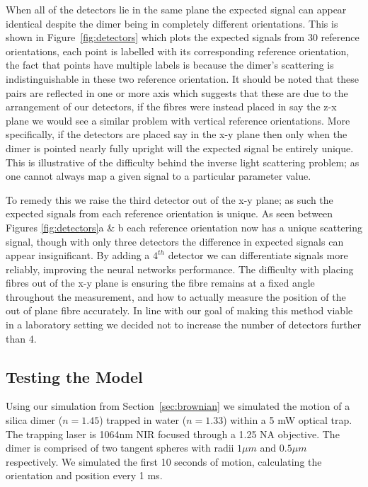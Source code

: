 \documentclass[preprint,  3p]{elsarticle}
\begin{document}
 When all of the detectors lie in the same plane the expected signal can appear identical despite the dimer being in completely different orientations. This is shown in Figure~\ref{fig:detectors} which plots the expected signals from 30 reference orientations, each point is labelled with its corresponding reference orientation, the fact that points have multiple labels is because the dimer's scattering is indistinguishable in these two reference orientation. It should be noted that these pairs are reflected in one or more axis which suggests that these are due to the arrangement of our detectors, if the fibres were instead placed in say the z-x plane we would see a similar problem with vertical reference orientations. More specifically, if the detectors are placed say in the x-y plane then only when the dimer is pointed nearly fully upright will the expected signal be entirely unique. This is illustrative of the difficulty behind the inverse light scattering problem; as one cannot always map a given signal to a particular parameter value.

To remedy this we raise the third detector out of the x-y plane; as such the expected signals from each reference orientation is unique. As seen between Figures \ref{fig:detectors}a \& b each reference orientation now has a unique scattering signal, though with only three detectors the difference in expected signals can appear insignificant. By adding a $4^{th}$ detector we can differentiate signals more reliably, improving the neural networks performance. The difficulty with placing fibres out of the x-y plane is ensuring the fibre remains at a fixed angle throughout the measurement, and how to actually measure the position of the out of plane fibre accurately. In line with our goal of making this method viable in a laboratory setting we decided not to increase the number of detectors further than 4. 

\subsection{Testing the Model}
\label{sec:test}
Using our simulation from Section~\ref{sec:brownian} we simulated the motion of a silica dimer ($n = 1.45$) trapped in water ($n = 1.33$) within a 5 mW optical trap. The trapping laser is 1064nm NIR focused through a 1.25 NA objective. The dimer is comprised of two tangent spheres with radii $1 \mu m$ and $0.5 \mu m$ respectively. We simulated the first 10 seconds of motion, calculating the orientation and position every 1 ms. 
\end{document}
